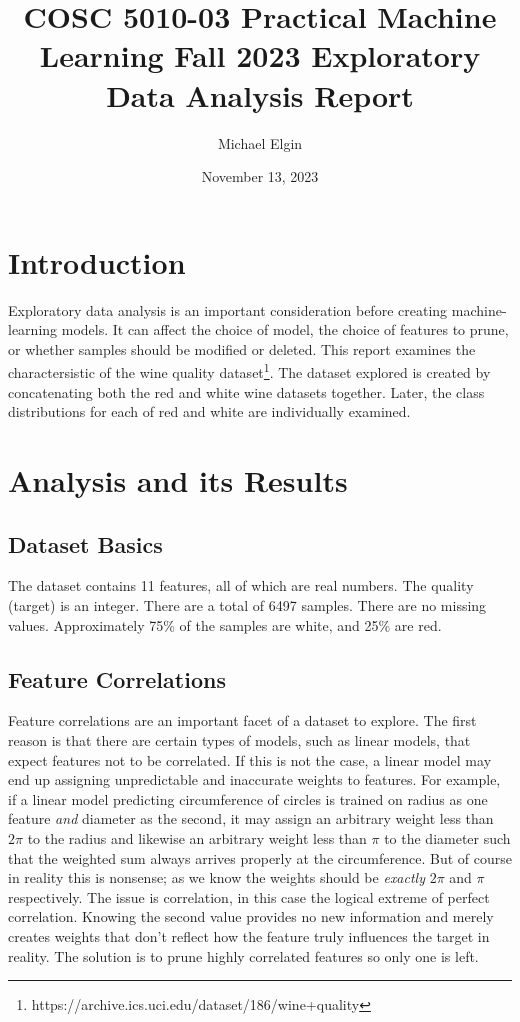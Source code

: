 \documentclass[12pt, letterpaper]{article}
\title{COSC 5010-03 Practical Machine Learning Fall 2023 Exploratory Data Analysis Report}
\author{Michael Elgin}
\date{November 13, 2023}
\begin{document}
\maketitle

\section{Introduction} %

Exploratory data analysis is an important consideration before creating machine-learning models. It can affect the choice of model, the choice of features to prune, or whether samples should be modified or deleted. This report examines the charactersistic of the wine quality dataset\footnote{https://archive.ics.uci.edu/dataset/186/wine+quality}. The dataset explored is created by concatenating both the red and white wine datasets together. Later, the class distributions for each of red and white are individually examined.

\section{Analysis and its Results}

\subsection{Dataset Basics}

The dataset contains 11 features, all of which are real numbers. The quality (target) is an integer. There are a total of 6497 samples. There are no missing values. Approximately 75\% of the samples are white, and 25\% are red.

\subsection{Feature Correlations}

Feature correlations are an important facet of a dataset to explore. The first reason is that there are certain types of models, such as linear models, that expect features not to be correlated. If this is not the case, a linear model may end up assigning unpredictable and inaccurate weights to features. For example, if a linear model predicting circumference of circles is trained on radius as one feature \emph{and} diameter as the second, it may assign an arbitrary weight less than $2\pi$ to the radius and likewise an arbitrary weight less than $\pi$ to the diameter such that the weighted sum always arrives properly at the circumference. But of course in reality this is nonsense; as we know the weights should be \emph{exactly} $2\pi$ and $\pi$ respectively. The issue is correlation, in this case the logical extreme of perfect correlation. Knowing the second value provides no new information and merely creates weights that don't reflect how the feature truly influences the target in reality. The solution is to prune highly correlated features so only one is left.
\end{document}

